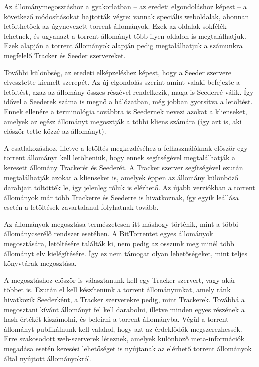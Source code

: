 \documentclass[a4paper]{article}
\begin{document}
Az állománymegosztáshoz a gyakorlatban – az eredeti elgondoláshoz képest – a következő módosításokat hajtották végre: vannak speciális weboldalak, ahonnan letölthetőek az úgynevezett torrent állományok. Ezek az oldalak sokfélék lehetnek, és ugyanazt a torrent állományt több ilyen oldalon is megtalálhatjuk. Ezek alapján a torrent állományok alapján pedig megtalálhatjuk a számunkra megfelelő Tracker és Seeder szervereket.

További különbség, az eredeti elképzeléshez képest, hogy a Seeder szervere elvesztette kiemelt szerepét. Az új elgondolás szerint amint valaki befejezte a letöltést, azaz az állomány összes részével rendelkezik, maga is Seederré válik. Így idővel a Seederek száma is megnő a hálózatban, még jobban gyorsítva a letöltést. Ennek ellenére a terminológia továbbra is Seedernek nevezi azokat a klienseket, amelyek az egész állományt megosztják a többi kliens számára (így azt is, aki először tette közzé az állományt).

A csatlakozáshoz, illetve a letöltés megkezdéséhez a felhasználóknak először egy torrent állományt kell letölteniük, hogy ennek segítségével megtalálhatják a keresett állomány Trackerét és Seederét. A Tracker szerver segítségével ezután megtalálhatják azokat a klienseket is, amelyek éppen az állomány különböző darabjait töltötték le, így jelenleg róluk is elérhető. Az újabb verziókban a torrent állományok már több Trackerre és Seederre is hivatkoznak, így egyik leállása esetén a letöltések zavartalanul folyhatnak tovább.

Az állományok megosztása természetesen itt máshogy történik, mint a többi állománycserélő rendszer esetében. A BitTorrentet egyes állományok megosztására, letöltésére találták ki, nem pedig az osszunk meg minél több állományt elv kielégítésére. Így ez nem támogat olyan lehetőségeket, mint teljes könyvtárak megosztása.

A megosztáshoz először is választanunk kell egy Tracker szervert, vagy akár többet is. Ezután el kell készítenünk a torrent állományunkat, amely ránk hivatkozik Seederként, a Tracker szerverekre pedig, mint Trackerek. Továbbá a megosztani kívánt állományt fel kell darabolni, illetve minden egyes részének a hash értékét kiszámolni, és beleírni a torrent állományba. Végül a torrent állományt publikálnunk kell valahol, hogy azt az érdeklődők megszerezhessék. Erre szakosodott web-szerverek léteznek, amelyek különböző meta-információk megadása esetén keresési lehetőséget is nyújtanak az elérhető torrent állományok által nyújtott állományokról.
\end{document}
